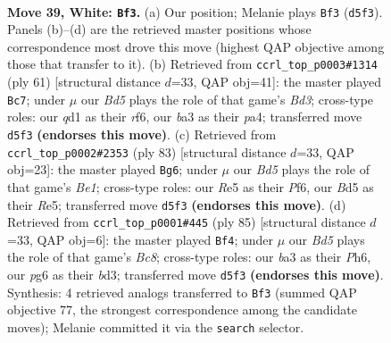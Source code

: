 \documentclass[11pt]{article}
\begin{document}
\clearpage

\begin{figure}[p]\centering
\begin{subfigure}{0.46\textwidth}\centering
\resizebox{\linewidth}{!}{%
\newchessgame
\chessboard[
  setfen={8/pp4kp/6p1/3BR3/5PPP/b7/6K1/3q4 w - - 1 39},
  showmover=false,
  pgfstyle=straightmove, color=movearrow, markmove={d5-f3}
]}
\caption{}
\end{subfigure}\hfill
\begin{subfigure}{0.46\textwidth}\centering
\resizebox{\linewidth}{!}{%
\newchessgame
\chessboard[
  setfen={1k6/8/3b1R2/3r4/PP4p1/6P1/4P1KP/8 b - - 2 31},
  showmover=false,
  pgfstyle=straightmove, color=movearrow, markmove={d6-c7}
]}
\caption{}
\end{subfigure}
\\[4pt]
\begin{subfigure}{0.46\textwidth}\centering
\resizebox{\linewidth}{!}{%
\newchessgame
\chessboard[
  setfen={1Q2b3/6k1/5p2/1P2r3/P4p1p/1B3P1P/3r4/5K2 b - - 0 42},
  showmover=false,
  pgfstyle=straightmove, color=movearrow, markmove={e8-g6}
]}
\caption{}
\end{subfigure}\hfill
\begin{subfigure}{0.46\textwidth}\centering
\resizebox{\linewidth}{!}{%
\newchessgame
\chessboard[
  setfen={8/8/1p5p/2r1kp2/1p5P/3B4/PP3P2/1Rb1K3 b - - 1 43},
  showmover=false,
  pgfstyle=straightmove, color=movearrow, markmove={c1-f4}
]}
\caption{}
\end{subfigure}
\caption{\textbf{Move 39, White: \texttt{Bf3}.} (a) Our position; Melanie plays \texttt{Bf3} (\texttt{d5f3}). Panels (b)--(d) are the retrieved master positions whose correspondence most drove this move (highest QAP objective among those that transfer to it). (b) Retrieved from \texttt{ccrl\_top\_p0003\#1314} (ply 61) [structural distance $d$=33, QAP obj=41]: the master played \texttt{Bc7}; under $\mu$ our \emph{Bd5} plays the role of that game's \emph{Bd3}; cross-type roles: our \emph{q}d1 as their \emph{r}f6, our \emph{b}a3 as their \emph{p}a4; transferred move \texttt{d5f3} \textbf{(endorses this move)}. (c) Retrieved from \texttt{ccrl\_top\_p0002\#2353} (ply 83) [structural distance $d$=33, QAP obj=23]: the master played \texttt{Bg6}; under $\mu$ our \emph{Bd5} plays the role of that game's \emph{Be1}; cross-type roles: our \emph{R}e5 as their \emph{P}f6, our \emph{B}d5 as their \emph{R}e5; transferred move \texttt{d5f3} \textbf{(endorses this move)}. (d) Retrieved from \texttt{ccrl\_top\_p0001\#445} (ply 85) [structural distance $d$=33, QAP obj=6]: the master played \texttt{Bf4}; under $\mu$ our \emph{Bd5} plays the role of that game's \emph{Bc8}; cross-type roles: our \emph{b}a3 as their \emph{P}h6, our \emph{p}g6 as their \emph{b}d3; transferred move \texttt{d5f3} \textbf{(endorses this move)}. Synthesis: 4 retrieved analogs transferred to \texttt{Bf3} (summed QAP objective 77, the strongest correspondence among the candidate moves); Melanie committed it via the \texttt{search} selector.}
\label{fig:thought-m76}
\end{figure}
\end{document}
